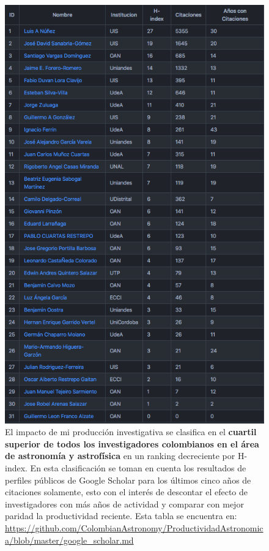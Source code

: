 \documentclass{article}
\begin{document}
\begin{figure}[!h]
\begin{center}
\includegraphics[scale=0.55]{scholar_astronomia.png}
\caption{
El impacto de mi producci\'on investigativa se clasifica en el {\bf cuartil
  superior de todos los investigadores colombianos en el \'area de
  astronom\'ia y astrof\'isica} en 
  un ranking decreciente por H-index. 
  En esta clasificaci\'on se toman en cuenta los resultados de
  perfiles p\'ublicos de Google Scholar
  para los \'ultimos cinco a\~nos de citaciones solamente, esto con el
  inter\'es de descontar el efecto de investigadores con m\'as a\~nos de
  actividad y comparar con mejor paridad la productividad
  reciente. 
Esta tabla se encuentra en: 
\url{https://github.com/ColombianAstronomy/ProductividadAstronomica/blob/master/google_scholar.md}
\label{table:astro}}
\end{center}
\end{figure}
\end{document}
